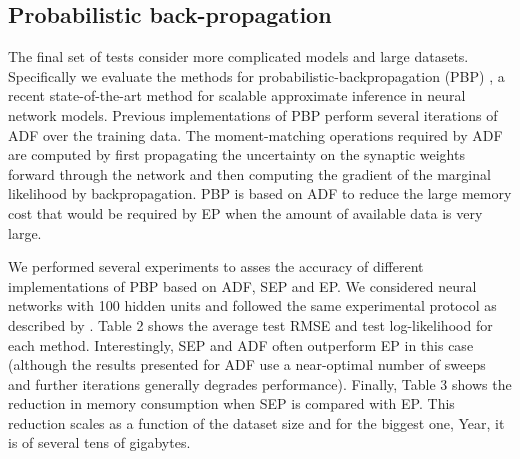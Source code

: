\subsection{Probabilistic back-propagation}

The final set of tests consider more complicated models and large datasets. Specifically we evaluate the methods for probabilistic-backpropagation (PBP) \cite{hernandez2015probabilistic}, a
recent state-of-the-art method for scalable approximate inference in neural
network models. Previous implementations of PBP perform several iterations of ADF over the training
data.  The moment-matching operations required by ADF are computed by
first propagating the uncertainty on the synaptic weights forward through the network
and then computing the gradient of the marginal likelihood by backpropagation.
PBP is based on ADF to reduce the large memory cost that would be required by EP
when the amount of available data is very large.

We performed several experiments to asses the accuracy of different implementations of PBP
based on ADF, SEP and EP. We considered neural networks with 100 hidden units and followed the same experimental protocol 
as described by \cite{hernandez2015probabilistic}.
Table 2 shows the average test RMSE and test log-likelihood for each method.
Interestingly, SEP and ADF often outperform EP in this case (although the results presented for ADF use a near-optimal number of sweeps and further iterations generally degrades performance). Finally, Table 3 shows the reduction in memory consumption when SEP is compared with EP.
This reduction scales as a function of the dataset size and for the biggest
one, Year, it is of several tens of gigabytes.
 
